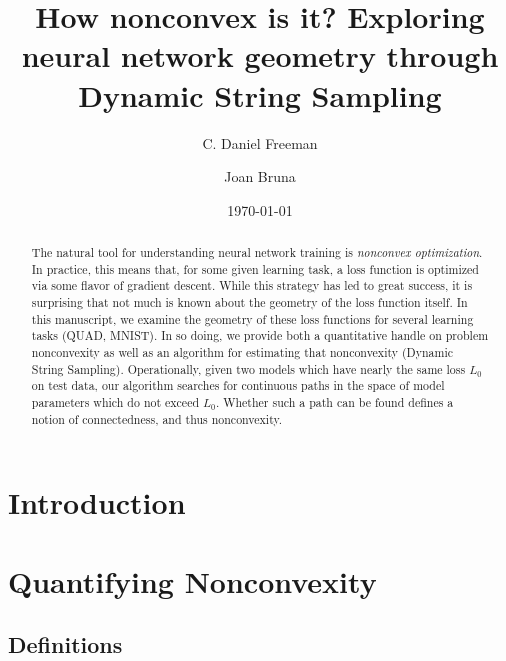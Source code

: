 \documentclass[twocolumn,superscriptaddress,aps,prb,floatfix]{revtex4-1}
\begin{document}

\title{How nonconvex is it? Exploring neural network geometry through Dynamic String Sampling}


\author{C. Daniel Freeman}

\author{Joan Bruna}


\date{\today}

\begin{abstract}
 The natural tool for understanding neural network training is \emph{nonconvex optimization}.  In practice, this means that, for some given learning task, a loss function is optimized via some flavor of gradient descent.  While this strategy has led to great success, it is surprising that not much is known about the geometry of the loss function itself.  In this manuscript, we examine the geometry of these loss functions for several learning tasks (QUAD, MNIST).  In so doing, we provide both a quantitative handle on problem nonconvexity as well as an algorithm for estimating that nonconvexity (Dynamic String Sampling).  Operationally, given two models which have nearly the same loss $L_0$ on test data, our algorithm searches for continuous paths in the space of model parameters which do not exceed $L_0$.  Whether such a path can be found defines a notion of connectedness, and thus nonconvexity.
\end{abstract}

\maketitle


\section{Introduction}
\label{sec:Intro}
  



	
\section{Quantifying Nonconvexity}
\label{sec:QuanNoncon}

\subsection{Definitions}
\label{sec:Defs}
\end{document}
